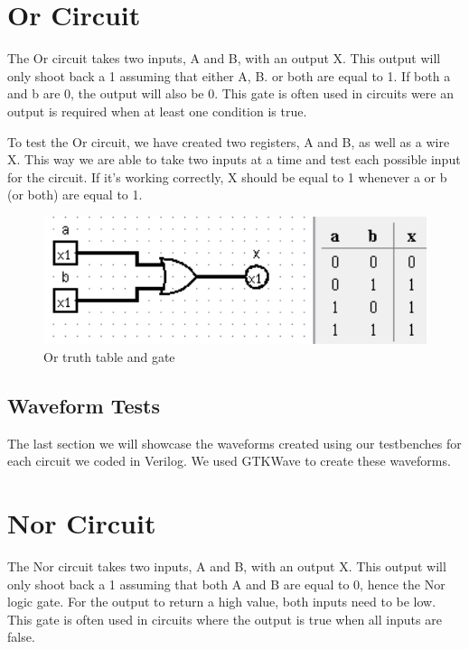 \documentclass[12pt]{article}
\begin{document}
\section{Or Circuit}
The Or circuit takes two inputs, A and B, with an output X. This output will only shoot back a 1 assuming that either A, B. or both are equal to 1. If both a and b are 0, the output will also be 0. This gate is often used in circuits were an output is required when at least one condition is true.


To test the Or circuit, we have created two registers, A and B, as well as a wire X. This way we are able to take two inputs at a time and test each possible input for the circuit. If it's working correctly, X should be equal to 1 whenever a or b (or both) are equal to 1.


\begin{figure}[h]
    \centering
    \includegraphics[width = 1.0\textwidth]{figs/or.png}
    \caption{Or truth table and gate}
    \label{fig:enter-label}
\end{figure}



\subsection{Waveform Tests}

The last section we will showcase the waveforms created using our testbenches for each circuit we coded in Verilog. We used GTKWave to create these waveforms.







\section{Nor Circuit}
The Nor circuit takes two inputs, A and B, with an output X. This output will only shoot back a 1 assuming that both A and B are equal to 0, hence the Nor logic gate. For the output to return a high value, both inputs need to be low. This gate is often used in circuits where the output is true when all inputs are false.

\end{document}
